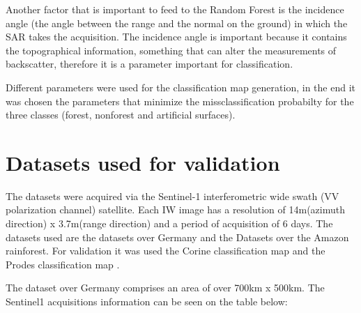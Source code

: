 Another factor that is important to feed to the Random Forest is the incidence angle (the angle between the range and the normal on the ground) in which the SAR takes the acquisition. The incidence angle is important because it contains the topographical information, something that can alter the measurements of backscatter, therefore it is a parameter important for classification.

Different parameters were used for the classification map generation, in the end it was chosen the parameters that minimize the missclassification probabilty for the three classes (forest, nonforest and artificial surfaces).
\newpage
\section{Datasets used for validation}
\label{tresponto5}
The datasets were acquired via the Sentinel-1 interferometric wide swath (VV polarization channel) satellite. Each IW image has a resolution of 14m(azimuth direction) x 3.7m(range direction) and a period of acquisition of 6 days. 
The datasets used are the datasets over Germany and the Datasets over the Amazon rainforest. For validation it was used the Corine classification map \cite{corine} and the Prodes classification map \cite{prodes}.

The dataset over Germany comprises an area of over 700km x 500km. The Sentinel1 acquisitions information can be seen on the table below:
\\

